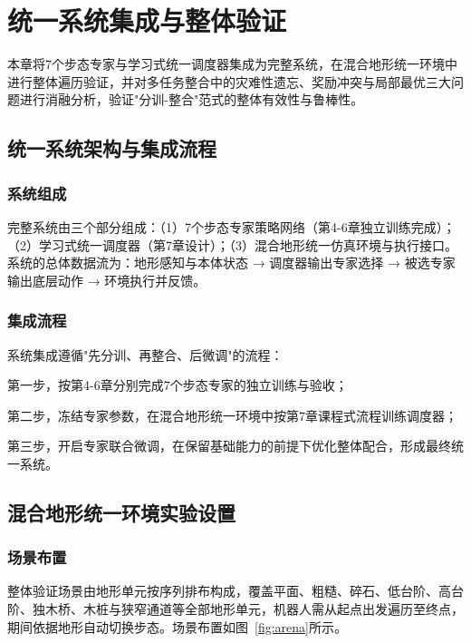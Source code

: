
\chapter[统一系统集成与整体验证]{统一系统集成与整体验证}
\label{cha:integration}

本章将7个步态专家与学习式统一调度器集成为完整系统，在混合地形统一环境中进行整体遍历验证，并对多任务整合中的灾难性遗忘、奖励冲突与局部最优三大问题进行消融分析，验证"分训-整合"范式的整体有效性与鲁棒性。

\section{统一系统架构与集成流程}

\subsection{系统组成}

完整系统由三个部分组成：（1）7个步态专家策略网络（第4-6章独立训练完成）；（2）学习式统一调度器（第7章设计）；（3）混合地形统一仿真环境与执行接口。系统的总体数据流为：地形感知与本体状态 → 调度器输出专家选择 → 被选专家输出底层动作 → 环境执行并反馈。

\subsection{集成流程}

系统集成遵循"先分训、再整合、后微调"的流程：

第一步，按第4-6章分别完成7个步态专家的独立训练与验收；

第二步，冻结专家参数，在混合地形统一环境中按第7章课程式流程训练调度器；

第三步，开启专家联合微调，在保留基础能力的前提下优化整体配合，形成最终统一系统。

\section{混合地形统一环境实验设置}

\subsection{场景布置}

整体验证场景由地形单元按序列排布构成，覆盖平面、粗糙、碎石、低台阶、高台阶、独木桥、木桩与狭窄通道等全部地形单元，机器人需从起点出发遍历至终点，期间依据地形自动切换步态。场景布置如图~\ref{fig:arena}所示。

